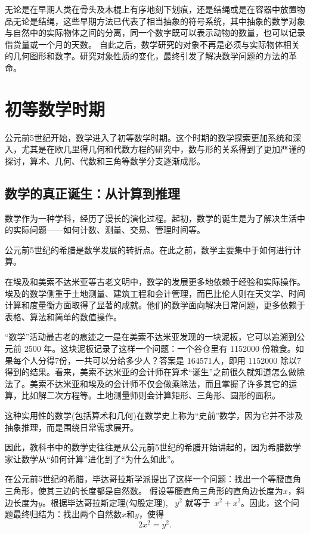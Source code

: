 无论是在早期人类在骨头及木棍上有序地刻下划痕，还是结绳或是在容器中放置物品无论是结绳，这些早期方法已代表了相当抽象的符号系统，其中抽象的数学对象与自然中的实际物体之间的分离，同一个数字既可以表示动物的数量，也可以记录借贷量或一个月的天数。
自此之后，数学研究的对象不再是必须与实际物体相关的几何图形和数字。研究对象性质的变化，最终引发了解决数学问题的方法的革命。

\section{初等数学时期}
公元前5世纪开始，数学进入了初等数学时期。这个时期的数学探索更加系统和深入，尤其是在欧几里得几何和代数方程的研究中，数与形的关系得到了更加严谨的探讨，算术、几何、代数和三角等数学分支逐渐成形。

\subsection{数学的真正诞生：从计算到推理}
数学作为一种学科，经历了漫长的演化过程。起初，数学的诞生是为了解决生活中的实际问题——如何计数、测量、交易、管理时间等。

公元前5世纪的希腊是数学发展的转折点。在此之前，数学主要集中于如何进行计算。

在埃及和美索不达米亚等古老文明中，数学的发展更多地依赖于经验和实际操作。埃及的数学侧重于土地测量、建筑工程和会计管理，而巴比伦人则在天文学、时间计算和度量衡方面取得了显著的成就。他们的数学面向解决日常问题，更多依赖于表格、算法和简单的数值操作。

“数学”活动最古老的痕迹之一是在美索不达米亚发现的一块泥板，它可以追溯到公元前 2500 年。这块泥板记录了这样一个问题：一个谷仓里有 1152000 份粮食。如果每个人分得7份，一共可以分给多少人？答案是 164571人，即用 1152000 除以7得到的结果。看来，美索不达米亚的会计师在算术“诞生”之前很久就知道怎么做除法了。美索不达米亚和埃及的会计师不仅会做乘除法，而且掌握了许多其它的运算，比如解二次方程等。土地测量师则会计算矩形、三角形、圆形的面积。

这种实用性的数学(包括算术和几何)在数学史上称为“史前”数学，因为它并不涉及抽象推理，而是围绕日常需求展开。
	
因此，教科书中的数学史往往是从公元前5世纪的希腊开始讲起的，因为希腊数学家让数学从“如何计算”进化到了“为什么如此”。

在公元前5世纪的希腊，毕达哥拉斯学派提出了这样一个问题：找出一个等腰直角三角形，使其三边的长度都是自然数。
假设等腰直角三角形的直角边长度为$x$，斜边长度为$y$。根据毕达哥拉斯定理(勾股定理), ~$y^2$ 就等于~$x^2+x^2$。因此，这个问题最终归结为：找出两个自然数$x$和$y$，使得
\begin{equation}\label{eqn}
2x^2=y^2.
\end{equation}

